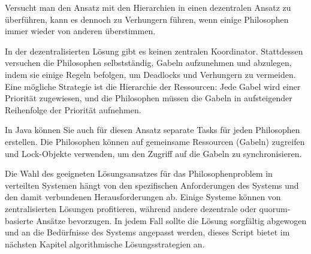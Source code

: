 Versucht man den Ansatz mit den Hierarchien in einen dezentralen Ansatz zu überführen, kann es dennoch zu Verhungern führen, wenn einige Philosophen immer wieder von anderen überstimmen.

In der dezentralisierten Lösung gibt es keinen zentralen Koordinator. Stattdessen versuchen die Philosophen selbstständig, Gabeln aufzunehmen und abzulegen, indem sie einige Regeln befolgen, um Deadlocks und Verhungern zu vermeiden. Eine mögliche Strategie ist die Hierarchie der Ressourcen: Jede Gabel wird einer Priorität zugewiesen, und die Philosophen müssen die Gabeln in aufsteigender Reihenfolge der Priorität aufnehmen.

In Java können Sie auch für diesen Ansatz separate Tasks für jeden Philosophen erstellen. Die Philosophen können auf gemeinsame Ressourcen (Gabeln) zugreifen und Lock-Objekte verwenden, um den Zugriff auf die Gabeln zu synchronisieren.

Die Wahl des geeigneten Lösungsansatzes für das Philosophenproblem in verteilten Systemen hängt von den spezifischen Anforderungen des Systems und den damit verbundenen Herausforderungen ab. Einige Systeme können von zentralisierten Lösungen profitieren, während andere dezentrale oder quorum-basierte Ansätze bevorzugen. In jedem Fall sollte die Lösung sorgfältig abgewogen und an die Bedürfnisse des Systems angepasst werden, dieses Script bietet im nächsten Kapitel algorithmische Lösungsstrategien an.




